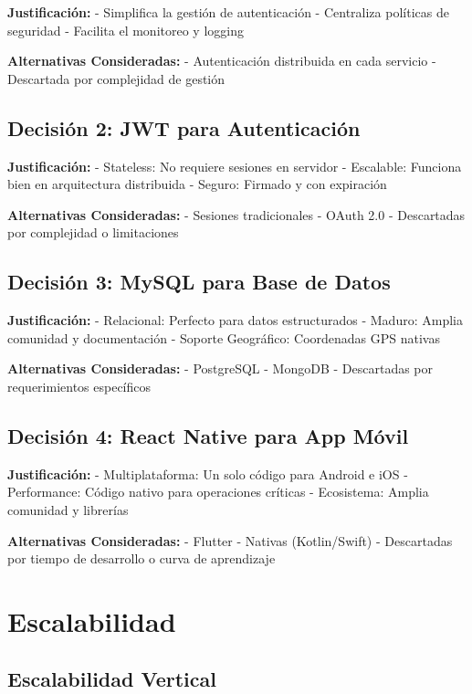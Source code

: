 \documentclass[
  spanish,
  11pt,
  letterpaper,
]{book}
\begin{document}
\textbf{Justificación:} - Simplifica la gestión de autenticación -
Centraliza políticas de seguridad - Facilita el monitoreo y logging

\textbf{Alternativas Consideradas:} - Autenticación distribuida en cada
servicio - Descartada por complejidad de gestión

\subsection{Decisión 2: JWT para
Autenticación}\label{decisiuxf3n-2-jwt-para-autenticaciuxf3n}

\textbf{Justificación:} - Stateless: No requiere sesiones en servidor -
Escalable: Funciona bien en arquitectura distribuida - Seguro: Firmado y
con expiración

\textbf{Alternativas Consideradas:} - Sesiones tradicionales - OAuth 2.0
- Descartadas por complejidad o limitaciones

\subsection{Decisión 3: MySQL para Base de
Datos}\label{decisiuxf3n-3-mysql-para-base-de-datos}

\textbf{Justificación:} - Relacional: Perfecto para datos estructurados
- Maduro: Amplia comunidad y documentación - Soporte Geográfico:
Coordenadas GPS nativas

\textbf{Alternativas Consideradas:} - PostgreSQL - MongoDB - Descartadas
por requerimientos específicos

\subsection{Decisión 4: React Native para App
Móvil}\label{decisiuxf3n-4-react-native-para-app-muxf3vil}

\textbf{Justificación:} - Multiplataforma: Un solo código para Android e
iOS - Performance: Código nativo para operaciones críticas - Ecosistema:
Amplia comunidad y librerías

\textbf{Alternativas Consideradas:} - Flutter - Nativas (Kotlin/Swift) -
Descartadas por tiempo de desarrollo o curva de aprendizaje

\section{Escalabilidad}\label{escalabilidad}

\subsection{Escalabilidad Vertical}\label{escalabilidad-vertical}
\end{document}

